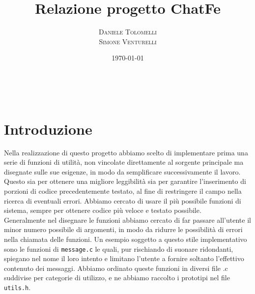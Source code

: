 \documentclass[a4paper, 11pt]{article} %
\title{\textbf{Relazione progetto ChatFe} }
\author{\textsc{Daniele Tolomelli \\ Simone Venturelli}} %
\date{\today} %
\makeatletter
\renewcommand{\maketitle}{ %
\begin{flushright} %
{\LARGE\@title} %

\vspace{50pt} %

{\large\@author} %
\\\@date %

\vspace{40pt} %
\end{flushright}
}
\makeatother
\begin{document}
\maketitle %


\section*{Introduzione}

Nella realizzazione di questo progetto abbiamo scelto di implementare prima una serie di funzioni di utilità, non vincolate direttamente al sorgente principale ma disegnate sulle sue esigenze, in modo da semplificare successivamente il lavoro. Questo sia per ottenere una migliore leggibilità sia per garantire l'inserimento di porzioni di codice precedentemente testato, al fine di restringere il campo nella ricerca di eventuali errori. Abbiamo cercato di usare il più possibile funzioni di sistema, sempre per ottenere codice più veloce e testato possibile.\\ 
Generalmente nel disegnare le funzioni abbiamo cercato di far passare all'utente il minor numero possibile di argomenti, in modo da ridurre le possibilità di errori nella chiamata delle funzioni. Un esempio soggetto a questo stile implementativo sono le funzioni di \texttt{message.c} le quali, pur rischiando di suonare ridondanti, spiegano nel nome il loro intento e limitano l'utente a fornire soltanto l'effettivo contenuto dei messaggi. 
Abbiamo ordinato queste funzioni in diversi file .c suddivise per categorie di utilizzo, e ne abbiamo raccolto i prototipi nel file \texttt{utils.h}.\\
\end{document}
